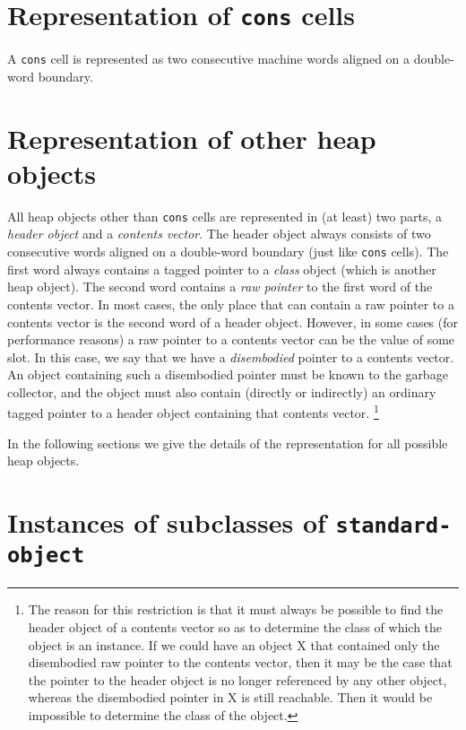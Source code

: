 \section{Representation of \texttt{cons} cells}

A \texttt{cons} cell is represented as two consecutive machine
words aligned on a double-word boundary.

\section{Representation of other heap objects}

All heap objects other than \texttt{cons} cells are represented in (at
least) two parts, a \emph{header object} and a \emph{contents vector}.
The header object always consists of two consecutive words aligned on
a double-word boundary (just like \texttt{cons} cells).  The first
word always contains a tagged pointer to a \emph{class} object (which
is another heap object).  The second word contains a \emph{raw
  pointer} to the first word of the contents vector.  In most cases,
the only place that can contain a raw pointer to a contents vector is
the second word of a header object.  However, in some cases (for
performance reasons) a raw pointer to a contents vector can be the
value of some slot.  In this case, we say that we have a
\emph{disembodied} pointer to a contents vector.  An object containing
such a disembodied pointer must be known to the garbage collector, and
the object must also contain (directly or indirectly) an ordinary
tagged \cl{} pointer to a header object containing that contents
vector.%
\footnote{The reason for this restriction is that it must always be possible
  to find the header object of a contents vector so as to determine
  the class of which the object is an instance.  If we could have
  an object X that contained only the disembodied raw pointer to the
  contents vector, then it may be the case that the pointer to the
  header object is no longer referenced by any other object, whereas
  the disembodied pointer in X is still reachable.  Then it would be
  impossible to determine the class of the object.}

In the following sections we give the details of the representation
for all possible heap objects.

\section{Instances of subclasses of \texttt{standard-object}}

